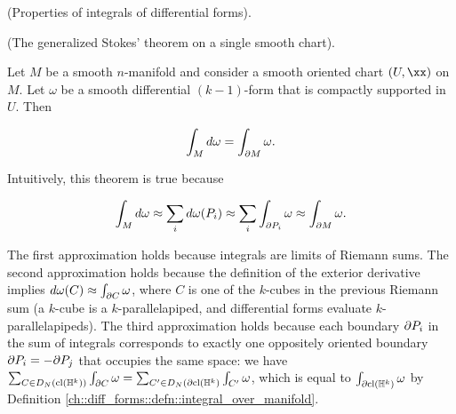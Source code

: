 \begin{theorem}
     (Properties of integrals of differential forms).
\end{theorem}

    

\begin{theorem}
\label{ch::diff_forms::theorem::stokes_on_a_smooth_chart}

     (The generalized Stokes' theorem on a single smooth chart).
    
    Let $M$ be a smooth $n$-manifold and consider a smooth oriented chart $(U, \xx)$ on $M$. Let $\omega$ be a smooth differential $(k - 1)$-form that is compactly supported in $U$. Then
    
    \begin{align*}
        \int_M d \omega = \int_{\partial M} \omega.
    \end{align*}
    
    Intuitively, this theorem is true because
    
    \begin{align*}
        \int_M d \omega \approx \sum_i d \omega(P_i) \approx \sum_i \int_{\partial P_i} \omega \approx \int_{\partial M} \omega.
    \end{align*}
    
    The first approximation holds because integrals are limits of Riemann sums. The second approximation holds because the definition of the exterior derivative implies $d\omega(C) \approx \int_{\partial C} \omega$, where $C$ is one of the $k$-cubes in the previous Riemann sum (a $k$-cube is a $k$-parallelapiped, and differential forms evaluate $k$-parallelapipeds). The third approximation holds because each boundary $\partial P_i$ in the sum of integrals corresponds to exactly one oppositely oriented boundary $\partial P_i = - \partial P_j$ that occupies the same space: we have $\sum_{C \in D_N(\text{cl}(\mathbb{H}^k))} \int_{\partial C} \omega = \sum_{C' \in D_N(\partial \text{cl}(\mathbb{H}^k)} \int_{C'} \omega$, which is equal to $\int_{\partial \text{cl}(\mathbb{H}^k)} \omega$ by Definition \ref{ch::diff_forms::defn::integral_over_manifold}.
    
\end{theorem}

